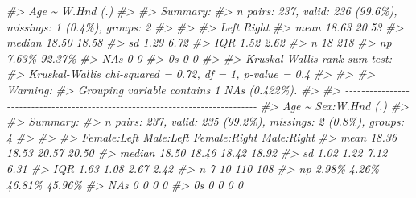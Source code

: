 \documentclass[
]{book}
\newenvironment{Shaded}{\begin{snugshade}}{\end{snugshade}}
\newcommand{\CommentTok}[1]{\textcolor[rgb]{0.56,0.35,0.01}{\textit{#1}}}
\begin{document}
\begin{Shaded}
\begin{Highlighting}[]
\CommentTok{\#\textgreater{} Age \textasciitilde{} W.Hnd (.)}
\CommentTok{\#\textgreater{} }
\CommentTok{\#\textgreater{} Summary: }
\CommentTok{\#\textgreater{} n pairs: 237, valid: 236 (99.6\%), missings: 1 (0.4\%), groups: 2}
\CommentTok{\#\textgreater{} }
\CommentTok{\#\textgreater{}                       }
\CommentTok{\#\textgreater{}           Left   Right}
\CommentTok{\#\textgreater{} mean     18.63   20.53}
\CommentTok{\#\textgreater{} median   18.50   18.58}
\CommentTok{\#\textgreater{} sd        1.29    6.72}
\CommentTok{\#\textgreater{} IQR       1.52    2.62}
\CommentTok{\#\textgreater{} n           18     218}
\CommentTok{\#\textgreater{} np       7.63\%  92.37\%}
\CommentTok{\#\textgreater{} NAs          0       0}
\CommentTok{\#\textgreater{} 0s           0       0}
\CommentTok{\#\textgreater{} }
\CommentTok{\#\textgreater{} Kruskal{-}Wallis rank sum test:}
\CommentTok{\#\textgreater{}   Kruskal{-}Wallis chi{-}squared = 0.72, df = 1, p{-}value = 0.4}
\CommentTok{\#\textgreater{} }
\CommentTok{\#\textgreater{} }
\CommentTok{\#\textgreater{} Warning:}
\CommentTok{\#\textgreater{}   Grouping variable contains 1 NAs (0.422\%).}
\CommentTok{\#\textgreater{} }
\CommentTok{\#\textgreater{} {-}{-}{-}{-}{-}{-}{-}{-}{-}{-}{-}{-}{-}{-}{-}{-}{-}{-}{-}{-}{-}{-}{-}{-}{-}{-}{-}{-}{-}{-}{-}{-}{-}{-}{-}{-}{-}{-}{-}{-}{-}{-}{-}{-}{-}{-}{-}{-}{-}{-}{-}{-}{-}{-}{-}{-}{-}{-}{-}{-}{-}{-}{-}{-}{-}{-}{-}{-}{-}{-}{-}{-}{-}{-}{-}{-}{-}{-} }
\CommentTok{\#\textgreater{} Age \textasciitilde{} Sex:W.Hnd (.)}
\CommentTok{\#\textgreater{} }
\CommentTok{\#\textgreater{} Summary: }
\CommentTok{\#\textgreater{} n pairs: 237, valid: 235 (99.2\%), missings: 2 (0.8\%), groups: 4}
\CommentTok{\#\textgreater{} }
\CommentTok{\#\textgreater{}                                                               }
\CommentTok{\#\textgreater{}          Female:Left     Male:Left  Female:Right    Male:Right}
\CommentTok{\#\textgreater{} mean           18.36         18.53         20.57         20.50}
\CommentTok{\#\textgreater{} median         18.50         18.46         18.42         18.92}
\CommentTok{\#\textgreater{} sd              1.02          1.22          7.12          6.31}
\CommentTok{\#\textgreater{} IQR             1.63          1.08          2.67          2.42}
\CommentTok{\#\textgreater{} n                  7            10           110           108}
\CommentTok{\#\textgreater{} np             2.98\%         4.26\%        46.81\%        45.96\%}
\CommentTok{\#\textgreater{} NAs                0             0             0             0}
\CommentTok{\#\textgreater{} 0s                 0             0             0             0}

\end{Highlighting}
\end{Shaded}
\end{document}
